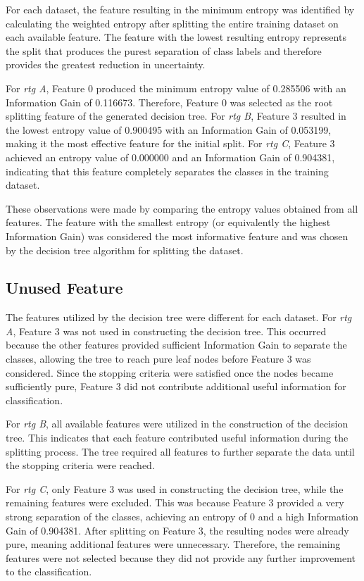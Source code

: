 \documentclass[conference,a4paper]{IEEEtran}
\begin{document}
For each dataset, the feature resulting in the minimum entropy was identified by
calculating the weighted entropy after splitting the entire training dataset on
each available feature. The feature with the lowest resulting entropy represents
the split that produces the purest separation of class labels and therefore
provides the greatest reduction in uncertainty.

For \textit{rtg A}, Feature 0 produced the minimum entropy value of 0.285506 with
an Information Gain of 0.116673. Therefore, Feature 0 was selected as the root
splitting feature of the generated decision tree. For \textit{rtg B}, Feature 3
resulted in the lowest entropy value of 0.900495 with an Information Gain of
0.053199, making it the most effective feature for the initial split. For
\textit{rtg C}, Feature 3 achieved an entropy value of 0.000000 and an Information
Gain of 0.904381, indicating that this feature completely separates the classes
in the training dataset.

These observations were made by comparing the entropy values obtained from all
features. The feature with the smallest entropy (or equivalently the highest
Information Gain) was considered the most informative feature and was chosen by
the decision tree algorithm for splitting the dataset.

\subsection{Unused Feature}
The features utilized by the decision tree were different for each dataset. For
\textit{rtg A}, Feature 3 was not used in constructing the decision tree. This
occurred because the other features provided sufficient Information Gain to
separate the classes, allowing the tree to reach pure leaf nodes before Feature
3 was considered. Since the stopping criteria were satisfied once the nodes
became sufficiently pure, Feature 3 did not contribute additional useful
information for classification.

For \textit{rtg B}, all available features were utilized in the construction of
the decision tree. This indicates that each feature contributed useful
information during the splitting process. The tree required all features to
further separate the data until the stopping criteria were reached.

For \textit{rtg C}, only Feature 3 was used in constructing the decision tree,
while the remaining features were excluded. This was because Feature 3 provided
a very strong separation of the classes, achieving an entropy of 0 and a high
Information Gain of 0.904381. After splitting on Feature 3, the resulting nodes
were already pure, meaning additional features were unnecessary. Therefore, the
remaining features were not selected because they did not provide any further
improvement to the classification.
\end{document}
